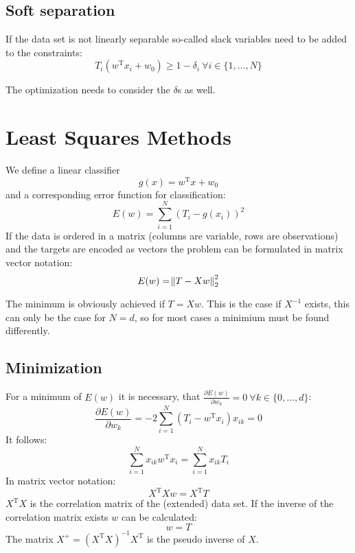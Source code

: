 \subsection{Soft separation}
If the data set is not linearly separable so-called slack variables need to be added to the constraints:
\begin{equation*}
    T_i (w^\text{T} x_i + w_0) \geq 1 - \delta_i\ \forall i \in \{1, \ldots, N\}
\end{equation*}

The optimization needs to consider the $\delta$s as well.

\section{Least Squares Methods}
We define a linear classifier
\begin{equation*}
    g(x) = w^\text{T} x + w_0
\end{equation*}
and a corresponding error function for classification:
\begin{equation*}
    E(w) = \sum_{i=1}^N {(T_i - g(x_i))}^2
\end{equation*}
If the data is ordered in a matrix (columns are variable, rows are observations) and the targets are encoded as vectors the problem can be formulated in matrix vector notation:
\begin{equation*}
    E(w) = \norm{T - X w }_2^2
\end{equation*}

The minimum is obviously achieved if $T = Xw$. This is the case if $X^{-1}$ exists, this can only be the case for $N=d$, so for most cases a minimium must be found differently.

\subsection{Minimization}
For a minimum of $E(w)$ it is necessary, that $\frac{\partial E(w)}{\partial w_k} = 0\ \forall k \in \{0, \ldots, d\}$:
\begin{equation*}
    \frac{\partial E(w)}{\partial w_k} = -2 \sum_{i=1}^N (T_i - w^\text{T} x_i) x_{ik} = 0
\end{equation*}
It follows:
\begin{equation*}
    \sum_{i=1}^N x_{ik} w^\text{T} x_i = \sum_{i=1}^N x_{ik} T_i 
\end{equation*}
In matrix vector notation:
\begin{equation*}
    X^\text{T} X w = X^\text{T} T
\end{equation*}
$X^\text{T}X$ is the correlation matrix of the (extended) data set.
If the inverse of the correlation matrix exists $w$ can be calculated:
\begin{equation*}
    w =  T
\end{equation*}
The matrix $X^+ = {(X^\text{T} X)}^{-1} X^\text{T}$ is the pseudo inverse of $X$.

